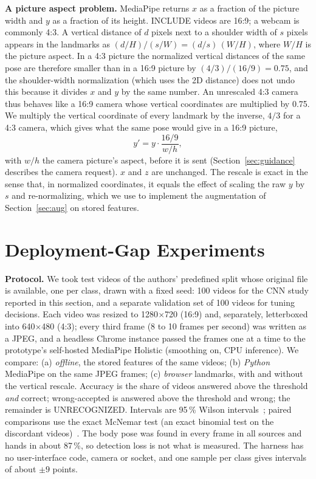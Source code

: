 \documentclass[conference]{IEEEtran}
\begin{document}
\textbf{A picture aspect problem.} MediaPipe returns $x$ as a fraction of the picture width and $y$ as a fraction of its height. INCLUDE videos are 16:9; a webcam is commonly 4:3. A vertical distance of $d$ pixels next to a shoulder width of $s$ pixels appears in the landmarks as $(d/H)/(s/W)=(d/s)\,(W/H)$, where $W/H$ is the picture aspect. In a 4:3 picture the normalized vertical distances of the same pose are therefore smaller than in a 16:9 picture by $(4/3)/(16/9)=0.75$, and the shoulder-width normalization (which uses the 2D distance) does not undo this because it divides $x$ and $y$ by the same number. An unrescaled 4:3 camera thus behaves like a 16:9 camera whose vertical coordinates are multiplied by 0.75. We multiply the vertical coordinate of every landmark by the inverse, $4/3$ for a 4:3 camera, which gives what the same pose would give in a 16:9 picture,
\begin{equation}
y' = y\cdot\frac{16/9}{w/h},
\end{equation}
with $w/h$ the camera picture's aspect, before it is sent (Section~\ref{sec:guidance} describes the camera request). $x$ and $z$ are unchanged. The rescale is exact in the sense that, in normalized coordinates, it equals the effect of scaling the raw $y$ by $s$ and re-normalizing, which we use to implement the augmentation of Section~\ref{sec:aug} on stored features.

\section{Deployment-Gap Experiments}\label{sec:gap}
\textbf{Protocol.} We took test videos of the authors' predefined split whose original file is available, one per class, drawn with a fixed seed: 100 videos for the CNN study reported in this section, and a separate validation set of 100 videos for tuning decisions. Each video was resized to 1280$\times$720 (16:9) and, separately, letterboxed into 640$\times$480 (4:3); every third frame (8 to 10 frames per second) was written as a JPEG, and a headless Chrome instance passed the frames one at a time to the prototype's self-hosted MediaPipe Holistic (smoothing on, CPU inference). We compare: (a) \emph{offline}, the stored features of the same videos; (b) \emph{Python} MediaPipe on the same JPEG frames; (c) \emph{browser} landmarks, with and without the vertical rescale. Accuracy is the share of videos answered above the threshold \emph{and} correct; wrong-accepted is answered above the threshold and wrong; the remainder is UNRECOGNIZED. Intervals are 95\,\% Wilson intervals~\cite{wilson1927}; paired comparisons use the exact McNemar test (an exact binomial test on the discordant videos)~\cite{mcnemar1947}. The body pose was found in every frame in all sources and hands in about 87\,\%, so detection loss is not what is measured. The harness has no user-interface code, camera or socket, and one sample per class gives intervals of about $\pm 9$ points.
\end{document}
